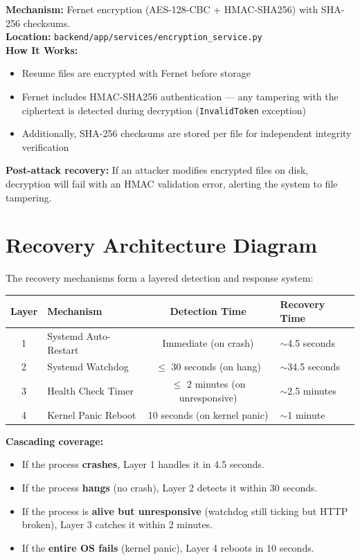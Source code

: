 \documentclass[11pt,a4paper]{article}
\begin{document}
\begin{tcolorbox}[colback=recoveryblue!5, colframe=recoveryblue]
\textbf{Mechanism:} Fernet encryption (AES-128-CBC + HMAC-SHA256) with SHA-256 checksums.\\
\textbf{Location:} \texttt{backend/app/services/encryption\_service.py}\\
\textbf{How It Works:}
\begin{itemize}[nosep]
  \item Resume files are encrypted with Fernet before storage
  \item Fernet includes HMAC-SHA256 authentication — any tampering with the ciphertext is detected during decryption (\texttt{InvalidToken} exception)
  \item Additionally, SHA-256 checksums are stored per file for independent integrity verification
\end{itemize}
\textbf{Post-attack recovery:} If an attacker modifies encrypted files on disk, decryption will fail with an HMAC validation error, alerting the system to file tampering.
\end{tcolorbox}

\section{Recovery Architecture Diagram}

The recovery mechanisms form a layered detection and response system:

\begin{center}
\begin{tabular}{clcl}
\toprule
\textbf{Layer} & \textbf{Mechanism} & \textbf{Detection Time} & \textbf{Recovery Time} \\
\midrule
1 & Systemd Auto-Restart & Immediate (on crash) & $\sim$4.5 seconds \\
2 & Systemd Watchdog & $\leq$ 30 seconds (on hang) & $\sim$34.5 seconds \\
3 & Health Check Timer & $\leq$ 2 minutes (on unresponsive) & $\sim$2.5 minutes \\
4 & Kernel Panic Reboot & 10 seconds (on kernel panic) & $\sim$1 minute \\
\bottomrule
\end{tabular}
\end{center}

\textbf{Cascading coverage:}
\begin{itemize}[nosep]
  \item If the process \textbf{crashes}, Layer 1 handles it in 4.5 seconds.
  \item If the process \textbf{hangs} (no crash), Layer 2 detects it within 30 seconds.
  \item If the process is \textbf{alive but unresponsive} (watchdog still ticking but HTTP broken), Layer 3 catches it within 2 minutes.
  \item If the \textbf{entire OS fails} (kernel panic), Layer 4 reboots in 10 seconds.
\end{itemize}
\end{document}

